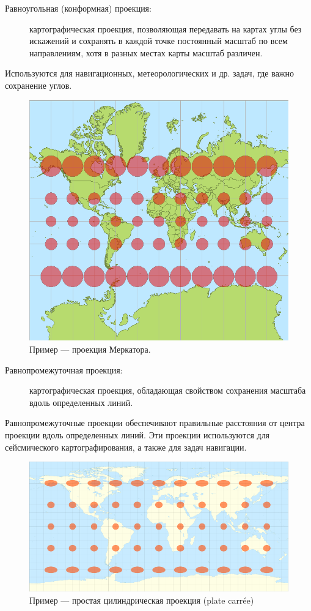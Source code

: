 \begin{frame}
    \begin{description}
        \item[Равноугольная (конформная) проекция:] картографическая проекция, позволяющая передавать на картах углы без искажений и сохранять в каждой точке постоянный масштаб по всем направлениям, хотя в разных местах карты масштаб различен.
    \end{description}
    Используются для навигационных, метеорологических и др. задач, где важно сохранение углов.
    \begin{figure}[!ht]
        \begin{center}
            \includegraphics[width=0.5\columnwidth]{./coordinates/img/merkator.png}
        \end{center}
        \caption{Пример --- проекция Меркатора.}
    \end{figure}

\end{frame}

\begin{frame}
    \begin{description}
        \item[Равнопромежуточная проекция:] картографическая проекция, обладающая свойством сохранения масштаба вдоль определенных линий.
    \end{description}
    Равнопромежуточные проекции обеспечивают правильные расстояния от центра проекции вдоль определенных линий. Эти проекции используются для сейсмического картографирования, а также для задач навигации.
    \begin{figure}[!ht]
        \begin{center}
            \includegraphics[width=0.8\columnwidth]{./coordinates/img/equidistant.png}
        \end{center}
        \caption{Пример --- простая цилиндрическая проекция (plate carrée)}
    \end{figure}
\end{frame}

